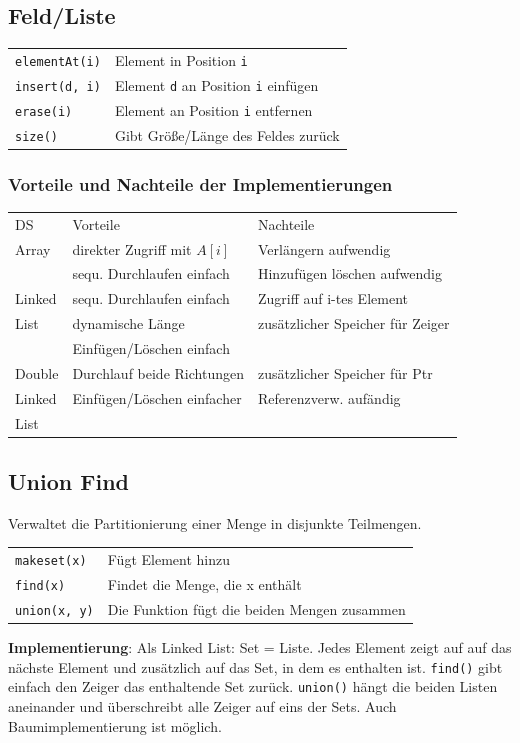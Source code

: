 \documentclass[fs, footer]{latex4ei}
\renewcommand{\t}{\texttt}
\begin{document}
\begin{multicols*}{4}
{{\subsection{Feld/Liste}
\begin{tabular}{ll}
\t{elementAt(i)}& Element in Position \t{i}\\
\t{insert(d, i)}& Element \t{d} an Position \t{i} einfügen\\
\t{erase(i)}& Element an Position \t{i} entfernen\\
\t{size()}& Gibt Größe/Länge des Feldes zurück\\

\end{tabular}

\subsubsection{Vorteile und Nachteile der Implementierungen}
\begin{tabular}{l|l|l}
DS & Vorteile & Nachteile \\
\brule
Array & direkter Zugriff mit $A[i]$ & Verlängern aufwendig \\
 & sequ. Durchlaufen einfach & Hinzufügen löschen aufwendig \\
\brule
Linked & sequ. Durchlaufen einfach & Zugriff auf i-tes Element\\
List & dynamische Länge & zusätzlicher Speicher für Zeiger\\
 & Einfügen/Löschen einfach & \\
\brule
Double & Durchlauf beide Richtungen & zusätzlicher Speicher für Ptr\\
Linked & Einfügen/Löschen einfacher & Referenzverw. aufändig\\
List & & \\
\end{tabular}

\subsection{Union Find}
Verwaltet die Partitionierung einer Menge in disjunkte Teilmengen.\\
\begin{tabular}{ll}
\t{makeset(x)}& Fügt Element hinzu\\
\t{find(x)}& Findet die Menge, die x enthält\\
\t{union(x, y)}& Die Funktion fügt die beiden Mengen zusammen\\
\end{tabular}
\textbf{Implementierung}: Als Linked List: Set = Liste. Jedes Element zeigt auf auf das nächste Element und zusätzlich auf das Set, in dem es enthalten ist. \t{find()} gibt einfach den Zeiger das enthaltende Set zurück. \t{union()} hängt die beiden Listen aneinander und überschreibt alle Zeiger auf eins der Sets. Auch Baumimplementierung ist möglich.

}}
\end{multicols*}
\end{document}
